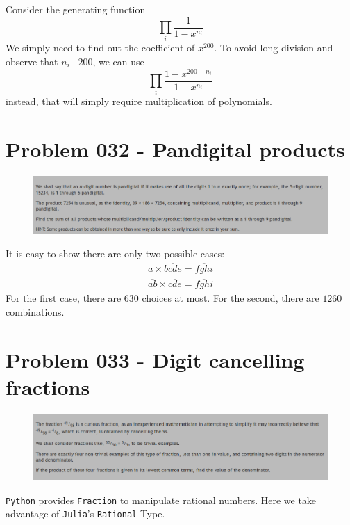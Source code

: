 \begin{sol}
Consider the generating function 
$$\prod_{i}\dfrac{1}{1 - x^{n_i}}$$
We simply need to find out the coefficient of $x^{200}$. To avoid long division and observe that $n_i \mid 200$, we can use 
$$\prod_{i}\dfrac{1 - x ^ {200 + n_i}}{1 - x^{n_i}} $$
instead, that will simply require multiplication of polynomials.
\vspace{1cm}
\end{sol}
\section{Problem 032 - Pandigital products}
\begin{prob}
	\begin{figure}[htb!]
		\begin{center}
			\includegraphics[scale = 0.4]{pic/032.png}
		\end{center}
	\end{figure}
\end{prob}
\begin{sol}
It is easy to show there are only two possible cases:
\begin{eqnarray}
\overline{a} \times \overline{bcde} = \overline{fghi}\\
\overline{ab}\times \overline{cde} = \overline{fghi}
\end{eqnarray}
For the first case, there are $630$ choices at most. For the second, there are $1260$ combinations.
\end{sol}
\newpage
\section{Problem 033 - Digit cancelling fractions}
\begin{prob}
	\begin{figure}[htb!]
		\begin{center}
			\includegraphics[scale = 0.4]{pic/033.png}
		\end{center}
	\end{figure}
\end{prob}
\begin{sol}
\texttt{Python} provides \texttt{Fraction} to manipulate rational numbers. Here we take advantage of \texttt{Julia}'s \texttt{Rational} Type.
\end{sol}
